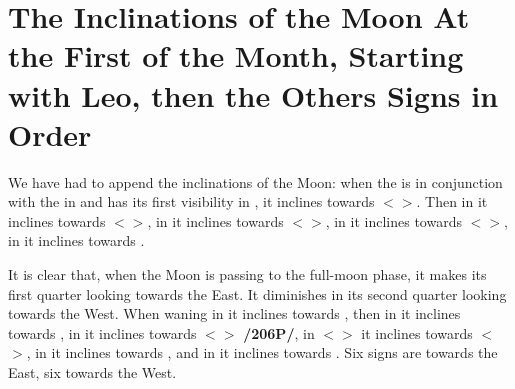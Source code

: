 \section{The Inclinations of the Moon At the First of the Month, Starting with Leo, then the Others Signs in Order}

We have had to append the inclinations of the Moon: when the \Moon\xspace is in conjunction with the \Sun\xspace in
\Cancer\xspace and has its first visibility in \Leo, it inclines towards $<$\Taurus$>$. Then in \Virgo\xspace it inclines towards $<$\Aries$>$, in \Libra\xspace it inclines towards $<$\Pisces$>$, in \Scorpio\xspace it inclines towards $<$\Aquarius$>$, in \Sagittarius\xspace it inclines towards \Capricorn. 

It is clear that, when the Moon is passing to the full-moon phase, it makes its first quarter looking towards the East. It diminishes in its second quarter looking towards the West. When waning in \Capricorn\xspace it inclines towards \Sagittarius, then in \Aquarius it inclines towards \Scorpio, in \Pisces\xspace it inclines towards $<$\Libra$>$ \textbf{/206P/}, in $<$\Aries$>$ it inclines towards $<$\Virgo$>$, in \Taurus\xspace it inclines towards \Leo, and in \Gemini\xspace it inclines towards \Cancer. Six signs are towards the East, six towards the West.

